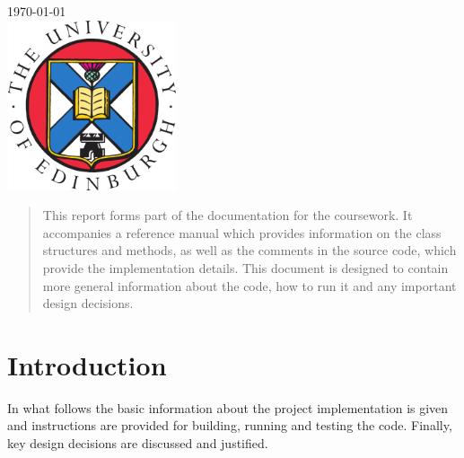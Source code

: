 \begin{titlepage}

{\large \today}\\[2cm] %


\includegraphics[width=5cm, height=5cm]{logo.png}\\[5cm] %
 

\vfill %

\end{titlepage}


\begin{abstract}
This report forms part of the documentation for the coursework. It accompanies a reference manual which provides information on the class structures and methods, as well as the comments in the source code, which provide the implementation details. This document is designed to contain more general information about the code, how to run it and any important design decisions. 
\end{abstract}

\section{Introduction}

In what follows the basic information about the project implementation is given and instructions are provided for building, running and testing the code. Finally, key design decisions are discussed and justified. 

